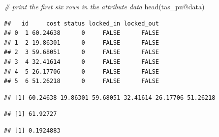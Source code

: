 \documentclass[
  12pt,
]{book}
\newenvironment{Shaded}{\begin{snugshade}}{\end{snugshade}}
\newcommand{\CommentTok}[1]{\textcolor[rgb]{0.56,0.35,0.01}{\textit{#1}}}
\newcommand{\FunctionTok}[1]{\textcolor[rgb]{0.00,0.00,0.00}{#1}}
\newcommand{\NormalTok}[1]{#1}
\newcommand{\SpecialCharTok}[1]{\textcolor[rgb]{0.00,0.00,0.00}{#1}}
\begin{document}
\begin{Shaded}
\begin{Highlighting}[]
\CommentTok{\# print the first six rows in the attribute data}
\FunctionTok{head}\NormalTok{(tas\_pu}\SpecialCharTok{@}\NormalTok{data)}
\end{Highlighting}
\end{Shaded}

\begin{verbatim}
##   id     cost status locked_in locked_out
## 0  1 60.24638      0     FALSE      FALSE
## 1  2 19.86301      0     FALSE      FALSE
## 2  3 59.68051      0     FALSE      FALSE
## 3  4 32.41614      0     FALSE      FALSE
## 4  5 26.17706      0     FALSE      FALSE
## 5  6 51.26218      0     FALSE      FALSE
\end{verbatim}

\begin{Shaded}
\end{Shaded}

\begin{verbatim}
## [1] 60.24638 19.86301 59.68051 32.41614 26.17706 51.26218
\end{verbatim}

\begin{Shaded}
\end{Shaded}

\begin{verbatim}
## [1] 61.92727
\end{verbatim}

\begin{Shaded}
\end{Shaded}

\begin{verbatim}
## [1] 0.1924883
\end{verbatim}
\end{document}
